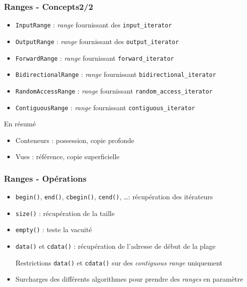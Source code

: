 \documentclass[C++.tex]{subfiles}
\begin{document}
\begin{frame}[fragile]
	\frametitle{Ranges - Concepts\titlehfill{}2/2}
	\begin{itemize}
		\item \lstinline|InputRange| : \textit{range} fournissant des \lstinline|input_iterator|
		\item \lstinline|OutputRange| : \textit{range} fournissant des \lstinline|output_iterator|
		\item \lstinline|ForwardRange| : \textit{range} fournissant \lstinline|forward_iterator|
		\item \lstinline|BidirectionalRange| : \textit{range} fournissant \lstinline|bidirectional_iterator|
		\item \lstinline|RandomAccessRange| : \textit{range} fournissant \lstinline|random_access_iterator|
		\item \lstinline|ContiguousRange| : \textit{range} fournissant \lstinline|contiguous_iterator|
	\end{itemize}

	\begin{block}{En résumé}
		\begin{itemize}
			\item Conteneurs : possession, copie profonde
			\item Vues : référence, copie superficielle
		\end{itemize}
	\end{block}

\end{frame}

\begin{frame}
	\frametitle{Ranges - Opérations}
	\begin{itemize}
		\item \lstinline|begin()|, \lstinline|end()|, \lstinline|cbegin()|, \lstinline|cend()|, \ldots : récupération des itérateurs


		\item \lstinline|size()| : récupération de la taille
		\item \lstinline|empty()| : teste la vacuité
		\item \lstinline|data()| et \lstinline|cdata()| : récupération de l'adresse de début de la plage

		\begin{alertblock}{Restrictions}
			\lstinline|data()| et \lstinline|cdata()| sur des \textit{contiguous range} uniquement
		\end{alertblock}

		\item Surcharges des différents algorithmes pour prendre des \textit{ranges} en paramètre
	\end{itemize}
\end{frame}
\end{document}
